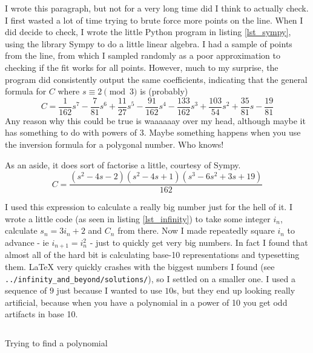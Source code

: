 I wrote this paragraph, but not for a very long time did I think to actually
check. I first wasted a lot of time trying to brute force more points on the
line. When I did decide to check, I wrote the little Python program in listing
\ref{lst_sympy}, using the library Sympy to do a little linear algebra. I had a
sample of points from the line, from which I sampled randomly as a poor
approximation to checking if the fit works for all points. However, much to my
surprise, the program did consistently output the same coefficients, indicating
that the general formula for \(C\) where \(s \equiv 2 \pmod 3\) is (probably)
\begin{equation*}
C = \frac{1}{162}s^7 - \frac{7}{81}s^6 + \frac{11}{27}s^5 - \frac{91}{162}s^4
    - \frac{133}{162}s^3 + \frac{103}{54}s^2 + \frac{35}{81}s - \frac{19}{81}
\end{equation*}
Any reason why this could be true is waaaaaay over my head, although maybe it
has something to do with powers of 3. Maybe something happens when you use the
inversion formula for a polygonal number. Who knows!

As an aside, it does sort of factorise a little, courtesy of Sympy.
\begin{equation*}
C = \frac{\left(s^{2} - 4 s - 2\right)
    \left(s^{2} - 4 s + 1\right) \left(s^{3} - 6 s^{2} + 3 s + 19\right)}{162}
\end{equation*}

I used this expression to calculate a really big number just for the hell of it.
I wrote a little code (as seen in listing \ref{lst_infinity}) to take some
integer \(i_n\), calculate \(s_n = 3i_n + 2\) and \(C_n\) from there. Now I made
repeatedly square \(i_n\) to advance - ie \(i_{n + 1} = i_n^2\) - just to
quickly get very big numbers. In fact I found that almost all of the hard bit is
calculating base-10 representations and typesetting them. \LaTeX{} very quickly
crashes with the biggest numbers I found (see
\texttt{../infinity\_and\_beyond/solutions/}), so I settled on a smaller one.
I used a sequence of \(9\) just because I wanted to use \(10\)s, but they end up
looking really artificial, because when you have a polynomial in a power of 10
you get odd artifacts in base 10.

\begin{longlisting}
\inputminted{python}{../investigate/solve.py}
\caption{Trying to find a polynomial}
\label{lst_sympy}
\end{longlisting}

